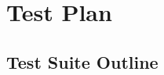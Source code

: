 \documentclass{scrreprt}
\begin{document}
\chapter{Test Plan}




\section{Test Suite Outline}
\end{document}
